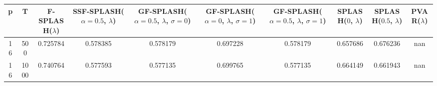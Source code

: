 \begin{tabular}{cccccccccc}
\hline
  p  &  T   &  F-SPLASH($\lambda$)  &  SSF-SPLASH($\alpha=0.5$, $\lambda$)  &  GF-SPLASH($\alpha=0.5$, $\lambda$, $\sigma=0$)  &  GF-SPLASH($\alpha=0$, $\lambda$, $\sigma=1$)  &  GF-SPLASH($\alpha=0.5$, $\lambda$, $\sigma=1$)  &  SPLASH($0$, $\lambda$)  &  SPLASH($0.5$, $\lambda$)  &  PVAR($\lambda$)  \\
\hline
 16  & 500  &       0.725784        &               0.578385                &                     0.578179                     &                    0.697228                    &                     0.578179                     &         0.657686         &          0.676236          &        nan        \\
 16  & 1000 &       0.740764        &               0.577593                &                     0.577135                     &                    0.699765                    &                     0.577135                     &         0.664149         &          0.661943          &        nan        \\
\hline
\end{tabular}